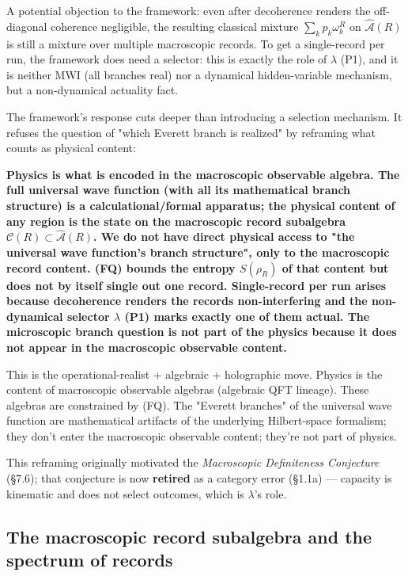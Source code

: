 \documentclass[11pt,a4paper]{article}
\newenvironment{qiqtquote}{\begin{mdframed}[style=quotestyle]}{\end{mdframed}}
\begin{document}
A potential objection to the framework: even after decoherence renders the off-diagonal coherence negligible, the resulting classical mixture $\sum_k p_k \omega_k^R$ on $\hat{\mathcal{A}}(R)$ is still a mixture over multiple macroscopic records. To get a single-record per run, the framework does need a selector: this is exactly the role of $\lambda$ (P1), and it is neither MWI (all branches real) nor a dynamical hidden-variable mechanism, but a non-dynamical actuality fact.

The framework's response cuts deeper than introducing a selection mechanism. It refuses the question of "which Everett branch is realized" by reframing what counts as physical content:

\begin{qiqtquote}
\textbf{Physics is what is encoded in the macroscopic observable algebra. The full universal wave function (with all its mathematical branch structure) is a calculational/formal apparatus; the physical content of any region is the state on the macroscopic record subalgebra $\mathcal{C}(R) \subset \hat{\mathcal{A}}(R)$. We do not have direct physical access to "the universal wave function's branch structure", only to the macroscopic record content. (FQ) bounds the entropy $S(\rho_R)$ of that content but does not by itself single out one record. Single-record per run arises because decoherence renders the records non-interfering and the non-dynamical selector $\lambda$ (P1) marks exactly one of them actual. The microscopic branch question is not part of the physics because it does not appear in the macroscopic observable content.}
\end{qiqtquote}

This is the operational-realist + algebraic + holographic move. Physics is the content of macroscopic observable algebras (algebraic QFT lineage). These algebras are constrained by (FQ). The "Everett branches" of the universal wave function are mathematical artifacts of the underlying Hilbert-space formalism; they don't enter the macroscopic observable content; they're not part of physics.

This reframing originally motivated the \emph{Macroscopic Definiteness Conjecture} (§7.6); that conjecture is now \textbf{retired} as a category error (§1.1a) — capacity is kinematic and does not select outcomes, which is $\lambda$'s role.

\subsection{The macroscopic record subalgebra and the spectrum of records}
\end{document}
